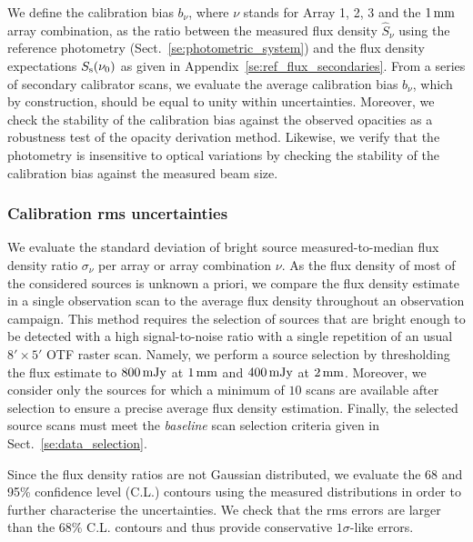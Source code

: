 We define the calibration bias
$b_{\nu}$, where $\nu$ stands for Array 1, 2, 3 and the
$1\,\rm{mm}$ array combination, as
the ratio between the measured flux density $\hat{S}_{\nu}$ using the
reference photometry
(Sect.~\ref{se:photometric_system}) and the flux density
expectations $S_{\rm{s}}(\nu_0)$ as given in
Appendix~\ref{se:ref_flux_secondaries}. From a series of
secondary calibrator scans, we evaluate the average calibration bias
$b_{\nu}$, which by construction, should be equal to
unity within uncertainties.
Moreover, we check the stability of the calibration bias against
the observed opacities as a robustness test of the
opacity derivation method. Likewise, we verify that the photometry is
insensitive to optical variations by checking the stability of the
calibration bias against the measured beam size.

\subsubsection{Calibration rms uncertainties}
\label{se:def_calibration_rms_error}
We evaluate the standard
deviation of bright source measured-to-median flux density ratio
$\sigma_{\nu}$ per array or array combination $\nu$.
As the flux density of most of the considered sources is unknown a priori, we
compare the flux density estimate in a single observation scan to the
average flux density throughout an observation campaign. This method
requires the selection of sources that are bright enough to be
detected with a high signal-to-noise ratio with a single repetition of an usual
$8'\times 5'$ OTF raster scan. Namely, we perform a source
selection by thresholding the flux estimate to $800\,\rm{mJy}$ at
$1\,\rm{mm}$ and $400\,\rm{mJy}$ at $2\,\rm{mm}$. Moreover, we consider
only the sources for which a minimum of $10$ scans are available after
selection to ensure a precise average flux density
estimation. Finally, the selected source scans must meet the \emph{baseline}
scan selection criteria given in Sect.~\ref{se:data_selection}.

{\lp Since the flux density ratios are not Gaussian distributed, we
evaluate the 68 and 95\% confidence level (C.L.) contours using the
measured distributions in order to further characterise the
uncertainties. We check that the rms
errors are larger than the 68\% C.L. contours and thus provide
conservative $1\sigma$-like errors.}    

